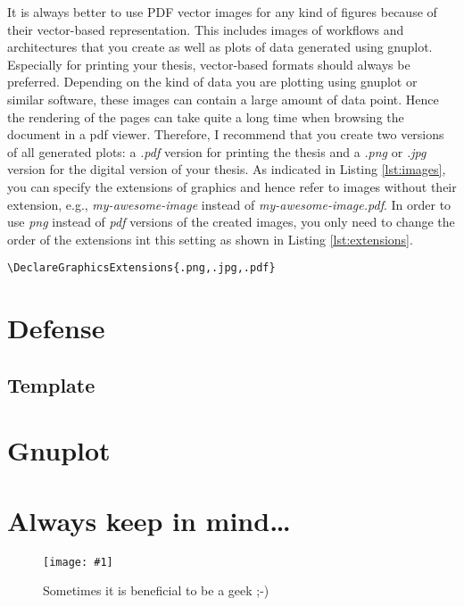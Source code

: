 \documentclass{article}
\newcommand{\img}[4]{
	\begin{figure}[!htb]
		\centering
		\texttt{[image: \#1]}
		\caption{#3}
		\label{#2}
	\end{figure}
}
\begin{document}
It is always better to use PDF vector images for any kind of figures because of their vector-based representation.
This includes images of workflows and architectures that you create as well as plots of data generated using gnuplot.
Especially for printing your thesis, vector-based formats should always be preferred.
Depending on the kind of data you are plotting using gnuplot or similar software, these images can contain a large amount of data point.
Hence the rendering of the pages can take quite a long time when browsing the document in a pdf viewer.
Therefore, I recommend that you create two versions of all generated plots: a \emph{.pdf} version for printing the thesis and a \emph{.png} or \emph{.jpg} version for the digital version of your thesis.
As indicated in Listing \ref{lst:images}, you can specify the extensions of graphics and hence refer to images without their extension, e.g., \emph{my-awesome-image} instead of \emph{my-awesome-image.pdf}.
In order to use \emph{png} instead of \emph{pdf} versions of the created images, you only need to change the order of the extensions int this setting as shown in Listing \ref{lst:extensions}.

\begin{lstlisting}[label={lst:extensions},caption='Packages and settings for including images']
	\DeclareGraphicsExtensions{.png,.jpg,.pdf}
\end{lstlisting}






\section{Defense}

\subsection{Template}

\subsection{}





\section{Gnuplot}





\section{Always keep in mind\dots}

\img{repetetive-tasks.png}{fig:geeks}{Sometimes it is beneficial to be a geek ;-)}{0.6}
\end{document}
